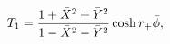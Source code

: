 \begin{equation}
T_1 = {1+\bar X^2+\bar Y^2 \over 1-\bar X^2-\bar Y^2} \cosh r_+
\bar \phi,
\end{equation}

